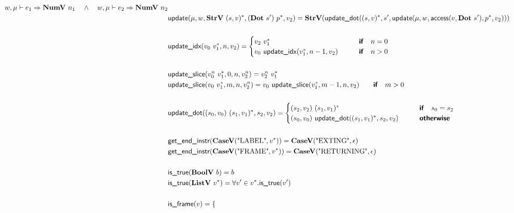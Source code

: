 \begin{align*}
  w, \mu \vdash e_1 \Rightarrow \numv ~ n_1 \quad\land\quad
  w, \mu \vdash e_2 \Rightarrow \numv ~ n_2 \\
  &\update(\mu, w, \strv ~ \seq{(s, v)}, (\dotp ~ s') ~ \seq{p}, v_2)
  =
  \strv (\updatedot(\seq{(s, v)}, s', \update(\mu, w, \access(v, \dotp ~ s'), \seq{p}, v_2))) \\
%
\newline \\
  &\updateidx(v_0 ~ \seq{v_1}, n, v_2) =
  \begin{cases}
    v_2 ~ \seq{v_1}
    &\quad\quad\premise{if}\quad n = 0 \\
    v_0 ~ \updateidx(\seq{v_1}, n-1, v_2)
    &\quad\quad\premise{if}\quad n > 0 \\
  \end{cases} \\
%
\newline \\
  &\updateslice(v_0^n ~ \seq{v_1}, 0, n, v_2^n) = v_2^n ~ \seq{v_1} \\
  &\updateslice(v_0 ~ \seq{v_1}, m, n, v_2^n) =  v_0 ~ \updateslice(\seq{v_1}, m-1, n, v_2)
  \quad\quad\premise{if}\quad m > 0 \\
%
\newline \\
  &\updatedot((s_0, v_0) ~ \seq{(s_1, v_1)}, s_2, v_2) =
  \begin{cases}
    (s_2, v_2) ~ \seq{(s_1, v_1)}
    &\quad\quad\premise{if}\quad s_0 = s_2 \\
    (s_0, v_0) ~ \updatedot(\seq{(s_1, v_1)}, s_2, v_2)
    &\quad\quad\premise{otherwise}
  \end{cases}
  \\
%
\newline \\
  &\getendinstr(\casev(\text{"LABEL"}, \seq v)) = \casev(\text{"EXTING"}, \epsilon) \\
  &\getendinstr(\casev(\text{"FRAME"}, \seq v)) = \casev(\text{"RETURNING"}, \epsilon) \\
%
\newline \\
  &\istrue(\boolv ~ b) = b \\
  &\istrue(\listv ~ \seq v) = \forall v' \in \seq v. \istrue (v') \\
%
\newline \\
  &\isframe(v) =
  \begin{cases}

\end{cases}
\end{align*}
